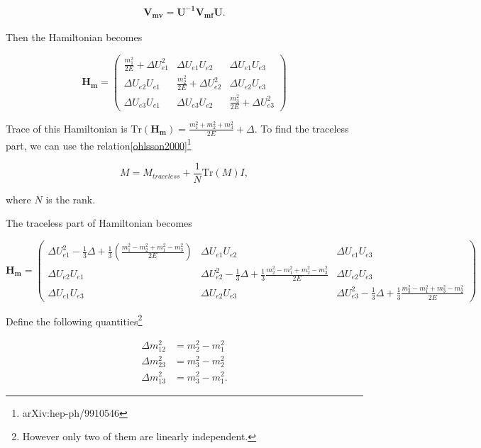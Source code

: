 \documentclass{tufte-handout}
\begin{document}
\begin{align*}
\mathbf{V_{mv}} = \mathbf{U^{-1}}\mathbf{V_{mf}} \mathbf{U}.
\end{align*}

Then the Hamiltonian becomes

\begin{equation*}
\mathbf{H_{m}} = \begin{pmatrix}
\frac{m_1^2}{2E} + \Delta U_{e1}^2 & \Delta U_{e1} U_{e2} & \Delta U_{e1} U_{e3} \\
\Delta U_{e2} U_{e1} & \frac{m_2^2}{2E} + \Delta U_{e2}^2 & \Delta U_{e2} U_{e3} \\
\Delta U_{e3} U_{e1} & \Delta U_{e3} U_{e2} & \frac{m_3^2}{2E} + \Delta U_{e3}^2
\end{pmatrix}
\end{equation*}

Trace of this Hamiltonian is $\mathrm{Tr}(\mathbf{H_m}) = \frac{m_1^2+m_2^2+m_3^2}{2E}+\Delta$. To find the traceless part, we can use the relation\ref{ohlsson2000}\footnote{arXiv:hep-ph/9910546}

\begin{equation*}
M = M_{traceless}+ \frac{1}{N} \mathrm{Tr}(M) I,
\end{equation*}

where $N$ is the rank.


The traceless part of Hamiltonian becomes

\begin{equation*}
\mathbf{H_{m}} = \begin{pmatrix}
\Delta U_{e1}^2 - \frac{1}{3}\Delta + \frac{1}{3}(\frac{m_1^2-m_2^2 + m_1^2-m_3^2}{2E}) & \Delta U_{e1}U_{e2} & \Delta U_{e1} U_{e3} \\
\Delta U_{e2} U_{e1} & \Delta U_{e2}^2 -\frac{1}{3}\Delta + \frac{1}{3}\frac{m_2^2 - m_1^2+m_2^2-m_3^2}{2E} & \Delta U_{e2}U_{e3} \\
\Delta U_{e1} U_{e3} & \Delta U_{e2} U_{e3} & \Delta U_{e3}^2 -\frac{1}{3} \Delta + \frac{1}{3} \frac{m_3^2 - m_1^2 + m_3^2-m_2^2 }{2E}
\end{pmatrix}
\end{equation*}

Define the following quantities\footnote{However only two of them are linearly independent.}

\begin{align*}
\Delta m_{12}^2 & = m_2^2 - m_1^2 \\
\Delta m_{23}^2 & = m_3^2 - m_2^2 \\
\Delta m_{13}^2 & = m_3^2 - m_1^2.
\end{align*}
\end{document}
